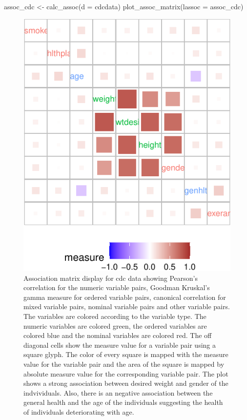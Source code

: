 \begin{Schunk}
\begin{Sinput}
assoc_cdc <- calc_assoc(d = cdcdata)
plot_assoc_matrix(lassoc = assoc_cdc)
\end{Sinput}
\begin{figure}

{\centering \includegraphics{rj_paper_files/figure-latex/assoc-matrix-cdcdata-1} 

}

\caption[Association matrix display for cdc data showing Pearson's correlation for the numeric variable pairs, Goodman Kruskal's gamma measure for ordered variable pairs, canonical correlation for mixed variable pairs, nominal variable pairs and other variable pairs]{Association matrix display for cdc data showing Pearson's correlation for the numeric variable pairs, Goodman Kruskal's gamma measure for ordered variable pairs, canonical correlation for mixed variable pairs, nominal variable pairs and other variable pairs. The variables are colored according to the variable type. The numeric variables are colored green, the ordered variables are colored blue and the nominal variables are colored red. The off diagonal cells show the measure value for a variable pair using a square glyph. The color of every square is mapped with the measure value for the variable pair and the area of the square is mapped by absolute measure value for the corresponding variable pair. The plot shows a strong association between desired weight and gender of the indvividuals. Also, there is an negative association between the general health and the age of the individuals suggesting the health of individuals deteriorating with age.}\label{fig:assoc-matrix-cdcdata}
\end{figure}
\end{Schunk}

